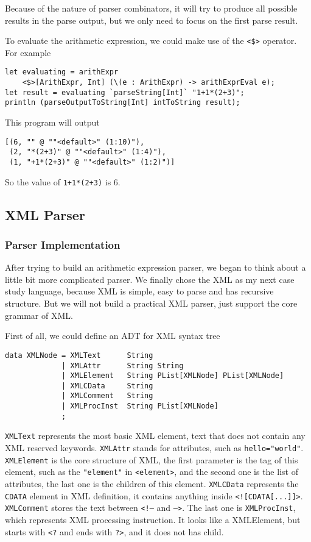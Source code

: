 Because of the nature of parser combinators, it will try to produce all possible results in the parse output, but we only need to focus on the first parse result.

To evaluate the arithmetic expression, we could make use of the \texttt{<\$>} operator. For example

\begin{lstlisting}
let evaluating = arithExpr
    <$>[ArithExpr, Int] (\(e : ArithExpr) -> arithExprEval e);
let result = evaluating `parseString[Int]` "1+1*(2+3)";
println (parseOutputToString[Int] intToString result);
\end{lstlisting}

This program will output

\begin{lstlisting}
[(6, "" @ ""<default>" (1:10)"),
 (2, "*(2+3)" @ ""<default>" (1:4)"),
 (1, "+1*(2+3)" @ ""<default>" (1:2)")]
\end{lstlisting}

So the value of \texttt{1+1*(2+3)} is 6.

\subsection{XML Parser}

\subsubsection{Parser Implementation}

After trying to build an arithmetic expression parser, we began to think about a little bit more complicated parser. We finally chose the XML as my next case study language, because XML is simple, easy to parse and has recursive structure. But we will not build a practical XML parser, just support the core grammar of XML.

First of all, we could define an ADT for XML syntax tree

\begin{lstlisting}
data XMLNode = XMLText      String
             | XMLAttr      String String
             | XMLElement   String PList[XMLNode] PList[XMLNode]
             | XMLCData     String
             | XMLComment   String
             | XMLProcInst  String PList[XMLNode]
             ;
\end{lstlisting}

\texttt{XMLText} represents the most basic XML element, text that does not contain any XML reserved keywords. \texttt{XMLAttr} stands for attributes, such as \texttt{hello="world"}. \texttt{XMLElement} is the core structure of XML, the first parameter is the tag of this element, such as the \texttt{"element"} in \texttt{<element>}, and the second one is the list of attributes, the last one is the children of this element. \texttt{XMLCData} represents the \texttt{CDATA} element in XML definition, it contains anything inside \texttt{<![CDATA[...]]>}. \texttt{XMLComment} stores the text between \texttt{<!--} and \texttt{-->}. The last one is \texttt{XMLProcInst}, which represents XML processing instruction. It looks like a XMLElement, but starts with \texttt{<?} and ends with \texttt{?>}, and it does not has child.

